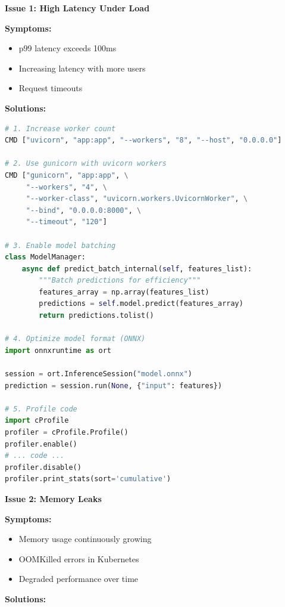 \textbf{Issue 1: High Latency Under Load}

\textbf{Symptoms:}
\begin{itemize}
    \item p99 latency exceeds 100ms
    \item Increasing latency with more users
    \item Request timeouts
\end{itemize}

\textbf{Solutions:}

\begin{lstlisting}[language=Python]
# 1. Increase worker count
CMD ["uvicorn", "app:app", "--workers", "8", "--host", "0.0.0.0"]

# 2. Use gunicorn with uvicorn workers
CMD ["gunicorn", "app:app", \
     "--workers", "4", \
     "--worker-class", "uvicorn.workers.UvicornWorker", \
     "--bind", "0.0.0.0:8000", \
     "--timeout", "120"]

# 3. Enable model batching
class ModelManager:
    async def predict_batch_internal(self, features_list):
        """Batch predictions for efficiency"""
        features_array = np.array(features_list)
        predictions = self.model.predict(features_array)
        return predictions.tolist()

# 4. Optimize model format (ONNX)
import onnxruntime as ort

session = ort.InferenceSession("model.onnx")
prediction = session.run(None, {"input": features})

# 5. Profile code
import cProfile
profiler = cProfile.Profile()
profiler.enable()
# ... code ...
profiler.disable()
profiler.print_stats(sort='cumulative')
\end{lstlisting}

\textbf{Issue 2: Memory Leaks}

\textbf{Symptoms:}
\begin{itemize}
    \item Memory usage continuously growing
    \item OOMKilled errors in Kubernetes
    \item Degraded performance over time
\end{itemize}

\textbf{Solutions:}

